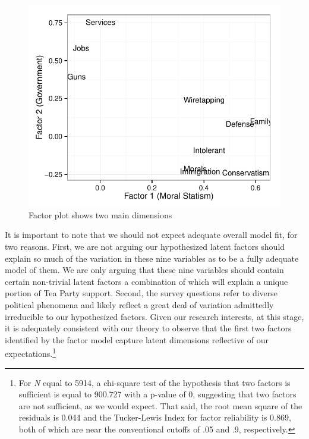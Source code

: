 \documentclass[12pt,]{article}
\begin{document}
\begin{figure}[htbp]
\centering
\includegraphics{figures/factorplot-1.pdf}
\caption{Factor plot shows two main dimensions}
\end{figure}

It is important to note that we should not expect adequate overall model
fit, for two reasons. First, we are not arguing our hypothesized latent
factors should explain so much of the variation in these nine variables
as to be a fully adequate model of them. We are only arguing that these
nine variables should contain certain non-trivial latent factors a
combination of which will explain a unique portion of Tea Party support.
Second, the survey questions refer to diverse political phenomena and
likely reflect a great deal of variation admittedly irreducible to our
hypothesized factors. Given our research interests, at this stage, it is
adequately consistent with our theory to observe that the first two
factors identified by the factor model capture latent dimensions
reflective of our expectations.\footnote{For \emph{N} equal to 5914, a
  chi-square test of the hypothesis that two factors is sufficient is
  equal to 900.727 with a p-value of 0, suggesting that two factors are
  not sufficient, as we would expect. That said, the root mean square of
  the residuals is 0.044 and the Tucker-Lewis Index for factor
  reliability is 0.869, both of which are near the conventional cutoffs
  of .05 and .9, respectively.}
\end{document}
